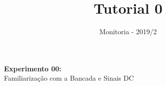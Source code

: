 \documentclass[10pt]{article}
\author{Monitoria - 2019/2}
\title{Tutorial 0}
\numberwithin{table}{section}
\begin{document}
\begin{center}
\vspace*{.03cm}
\Large\textbf{Experimento 00:}\\ %
\Large{Familiarização com a Bancada e Sinais DC}
\end{center}
\justify




\end{document}
